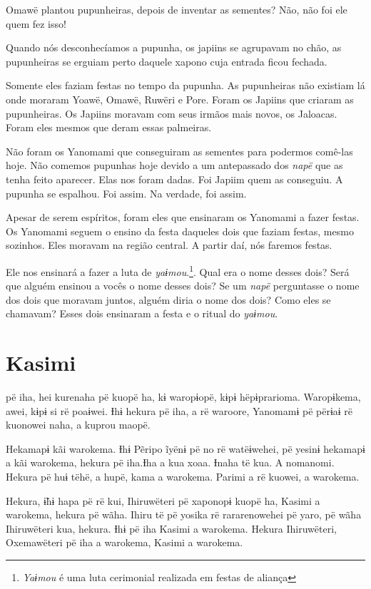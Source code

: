 Omawë plantou pupunheiras, depois de inventar as sementes? Não, não foi
ele quem fez isso!

Quando nós desconhecíamos a pupunha, os japiins se agrupavam no chão, as
pupunheiras se erguiam perto daquele xapono cuja entrada ficou fechada. 

Somente eles faziam festas no tempo da pupunha. As pupunheiras não
existiam lá onde moraram Yoawë, Omawë, Ruwëri e Pore. Foram os Japiins
que criaram as pupunheiras. Os Japiins moravam com seus irmãos mais
novos, os Jaloacas. Foram eles mesmos que deram essas palmeiras. 

Não foram os Yanomami que conseguiram as sementes para podermos comê-las
hoje. Não comemos pupunhas hoje devido a um antepassado
dos \textit{napë} que as tenha feito aparecer. Elas nos foram
dadas. Foi Japiim quem as conseguiu. A pupunha se espalhou. Foi
assim. Na verdade, foi assim. 

Apesar de serem espíritos, foram eles que ensinaram os Yanomami a fazer
festas. Os Yanomami seguem o ensino da festa daqueles dois que faziam
festas, mesmo sozinhos. Eles moravam na região central. A partir daí,
nós faremos festas. 

Ele nos ensinará a fazer a luta de \textit{yaɨmou}.\footnote{\textit{Yaɨmou} é uma luta cerimonial realizada em festas de aliança}. Qual era o nome
desses dois? Será que alguém ensinou a vocês o nome desses dois? Se
um \textit{napë} perguntasse o nome dos dois que moravam juntos, alguém
diria o nome dos dois? Como eles se chamavam? Esses dois
ensinaram a festa e o ritual do \textit{yaɨmou}. 

\chapter{Kasimi}
 
 pë iha, hei kurenaha pë kuopë ha, kɨ waropɨopë, kɨpɨ
hëpɨprarioma. Waropɨkema, awei, kɨpɨ si rë poaɨwei. Ɨhɨ hekura pë iha, a
rë waroore, Yanomamɨ pë përɨaɨ rë kuonowei naha, a kuprou maopë. 

Hekamapɨ kãi warokema. Ɨhɨ Pẽripo ĩyënɨ pë no rë watëɨwehei, pë yesinɨ
hekamapɨ a kãi warokema, hekura pë iha.Ɨha a kua xoaa. Ɨnaha të kua. A nomanomi. Hekura pë huɨ tëhë, a hupë, kama a warokema. Parimi a rë
kuowei, a warokema. 

Hekura, ɨ̃hɨ hapa pë rë kui, Ihiruwëteri pë xaponopɨ kuopë ha, Kasimi a
warokema, hekura pë wãha. Ihiru të pë yosika rë rararenowehei pë yaro,
pë wãha Ihiruwëteri kua, hekura. Ɨhɨ pë iha Kasimi a warokema. Hekura
Ihiruwëteri, Oxemawëteri pë iha a warokema, Kasimi a warokema. 

